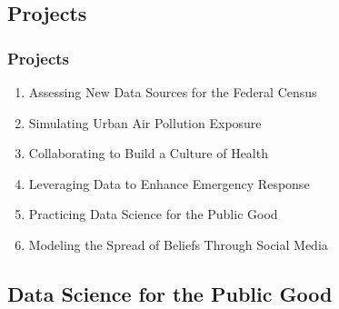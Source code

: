 \documentclass[compress]{beamer}
\begin{document}
\subsection[Projects]{Projects}

    \begin{frame}[Basic2] \frametitle{Projects}
        \begin{enumerate}
            \item Assessing New Data Sources for the Federal Census
            \item Simulating Urban Air Pollution Exposure
            \item Collaborating to Build a Culture of Health
            \item Leveraging Data to Enhance Emergency Response
            \item Practicing Data Science for the Public Good
            \item Modeling the Spread of Beliefs Through Social Media
        \end{enumerate}

    \end{frame}

\subsection[Data Science for the Public Good]{Data Science for the Public Good}
\end{document}
